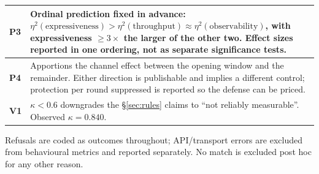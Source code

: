\begin{center}
\begin{tabularx}{\textwidth}{l X}
\midrule
\textbf{P3} & Ordinal prediction fixed in advance:
$\eta^2(\text{expressiveness})>\eta^2(\text{throughput})\approx\eta^2(\text{observability})$,
with expressiveness $\ge3\times$ the larger of the other two. Effect sizes reported in
one ordering, not as separate significance tests. \\
\midrule
\textbf{P4} & Apportions the channel effect between the opening window and the
remainder. Either direction is publishable and implies a different control; protection
per round suppressed is reported so the defense can be priced. \\
\midrule
\textbf{V1} & $\kappa<0.6$ downgrades the \S\ref{sec:rules} claims to ``not reliably
measurable''. Observed $\kappa=0.840$. \\
\bottomrule
\end{tabularx}
\end{center}

Refusals are coded as outcomes throughout; API/transport errors are excluded from
behavioural metrics and reported separately. No match is excluded post hoc for any
other reason.
